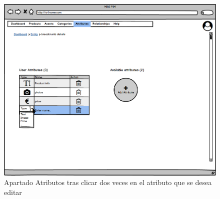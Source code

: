 \begin{figure}[H]
    \includegraphics[width=1\linewidth]{mockups/RF6.3Modificar_AtributoV2.png}
    \caption{Apartado Atributos tras clicar dos veces en el atributo que se desea editar}
   \end{figure}
\vspace{1.0cm}

\newpage %